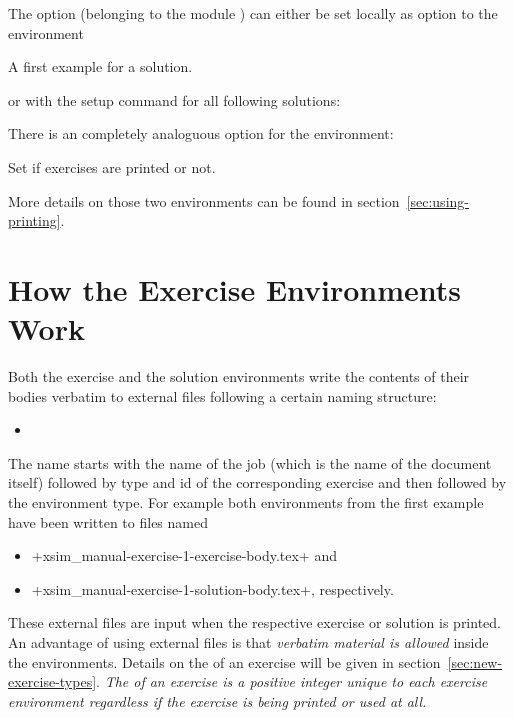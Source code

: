 \documentclass{xsim-manual}
\begin{document}
The option (belonging to the module ) can either be set
locally as option to the  environment
\begin{sourcecode}
  \begin{solution}[print=true]
    A first example for a solution.
  \end{solution}
\end{sourcecode}
or with the setup command for all following solutions:
\begin{sourcecode}
\end{sourcecode}

There is an completely analoguous option for the  environment:
\begin{options}
    Set if exercises are printed or not.
\end{options}
More details on those two environments can be found in
section~\vref{sec:using-printing}.

\section{How the Exercise Environments Work}\label{sec:how-exerc-envir}
Both the exercise and the solution environments write the contents of their
bodies verbatim to external files following a certain naming structure:
\begin{itemize}
  \item
\end{itemize}
The name starts with the name of the job (which is the name of the document
itself) followed by type and id of the corresponding exercise and then
followed by the environment type.  For example both environments from the first
example have been written to files named
\begin{itemize}
  \item \verbcode+xsim_manual-exercise-1-exercise-body.tex+ and
  \item \verbcode+xsim_manual-exercise-1-solution-body.tex+, respectively.
\end{itemize}
These external files are input when the respective exercise or solution is
printed.  An advantage of using external files is that \emph{verbatim material
  is allowed} inside the environments.  Details on the  of an
exercise will be given in section~\vref{sec:new-exercise-types}.  \emph{The
   of an exercise is a positive integer unique to each exercise
  environment regardless if the exercise is being printed or used at all.}
\end{document}
